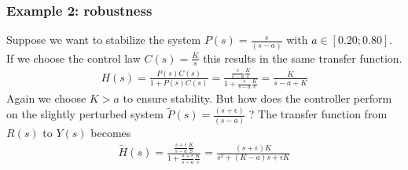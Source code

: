 \begin{frame}
	\frametitle{Example 2: robustness}
	\begin{example}
		Suppose we want to stabilize the system $P(s)=\frac{s}{(s - a)}$ with $a\in[0.20;0.80]$. If we choose the control law $C(s)=\frac{K}{s}$ this results in the same transfer function.
		\vspace{-0.5em}
		\begin{align*}
			H(s) = \frac{P(s)C(s)}{1+P(s)C(s)} = \frac{\frac{s}{s-a}\frac{K}{s}}{1+\frac{s}{s-a} \frac{K}{s}} = \frac{K}{s-a+K}
		\end{align*}
		Again we choose $K>a$ to ensure stability.
		But how does the controller perform on the slightly perturbed system $\tilde{P}(s)=\frac{(s+\epsilon)}{(s - a)}$  ?
		The transfer function from $R(s)$ to $Y(s)$ becomes
				\vspace{-0.5em}
		\begin{align*}
			\tilde{H}(s) = \frac{\frac{s+\epsilon}{s-a} \frac{K}{S}}{1+\frac{s+\epsilon}{s-a}\frac{K}{s}}
			= \frac{(s+\epsilon)K}{s^2 + (K-a)s + \epsilon K}
		\end{align*}
	\end{example}
\end{frame}

